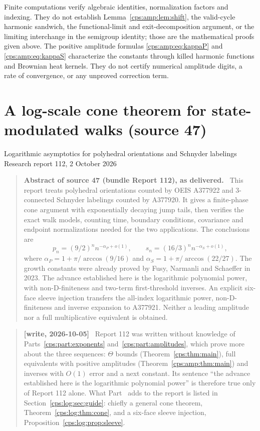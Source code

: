 \documentclass[11pt,letterpaper]{article}
\numberwithin{equation}{section}
\theoremstyle{remark}\newtheorem{remark}[theorem]{Remark}
\newenvironment{writenotelog}{\begin{quote}\small\sloppy\textbf{[write, 2026-10-05]}\ }{\end{quote}}
\newcommand{\ap}{\alpha_P}\newcommand{\as}{\alpha_S}
\newenvironment{sourceabstract}[1]{\begin{quote}\small\textbf{Abstract of #1, as delivered.}\ }{\end{quote}}
\begin{document}
Finite computations verify algebraic identities, normalization factors and indexing. They do not establish Lemma~\ref{cps:amp:lem:shift}, the valid-cycle harmonic sandwich, the functional-limit and exit-decomposition argument, or the limiting interchange in the semigroup identity; those are the mathematical proofs given above. The positive amplitude formulas \eqref{cps:amp:eq:kappaP} and \eqref{cps:amp:eq:kappaS} characterize the constants through killed harmonic functions and Brownian heat kernels. They do not certify numerical amplitude digits, a rate of convergence, or any unproved correction term.


\clearpage
\part{A log-scale cone theorem for state-modulated walks (source 47)}\label{cps:part:logcone}
\begin{center}\large Logarithmic asymptotics for polyhedral orientations and Schnyder labelings\\[2pt]
\normalsize Research report 112, 2 October 2026\end{center}
\begin{sourceabstract}{source 47 (bundle Report 112)}
This report treats polyhedral orientations counted by OEIS A377922 and
3-connected Schnyder labelings counted by A377920. It gives a finite-phase
cone argument with exponentially decaying jump tails, then verifies the exact
walk models, counting time, boundary conditions, covariance and endpoint
normalizations needed for the two applications. The conclusions are
\[
 p_n=(9/2)^n n^{-\ap+o(1)},\qquad
 s_n=(16/3)^n n^{-\as+o(1)},
\]
where $\ap=1+\pi/\arccos(9/16)$ and
$\as=1+\pi/\arccos(22/27)$. The growth constants were already proved by
Fusy, Narmanli and Schaeffer in 2023. The advance established here is the
logarithmic polynomial power, with non-D-finiteness and two-term
first-threshold inverses. An explicit six-face sleeve injection transfers the all-index
logarithmic power, non-D-finiteness and inverse expansion to A377921. Neither a
leading amplitude nor a full multiplicative equivalent is obtained.
\end{sourceabstract}

\begin{writenotelog}
Report 112 was written without knowledge of Parts~\ref{cps:part:exponents}
and~\ref{cps:part:amplitudes}, which prove more about the three sequences: $\Theta$ bounds
(Theorem~\ref{cps:thm:main}), full equivalents with positive amplitudes
(Theorem~\ref{cps:amp:thm:main}) and inverses with $O(1)$ error and a next constant. Its
sentence ``the advance established here is the logarithmic polynomial power'' is therefore
true only of Report 112 alone. What Part~\ref{cps:part:logcone} adds to the report is listed in
Section~\ref{cps:log:sec:guide}: chiefly a general cone theorem, Theorem~\ref{cps:log:thm:cone},
and a six-face sleeve injection, Proposition~\ref{cps:log:prop:sleeve}.
\end{writenotelog}
\end{document}
